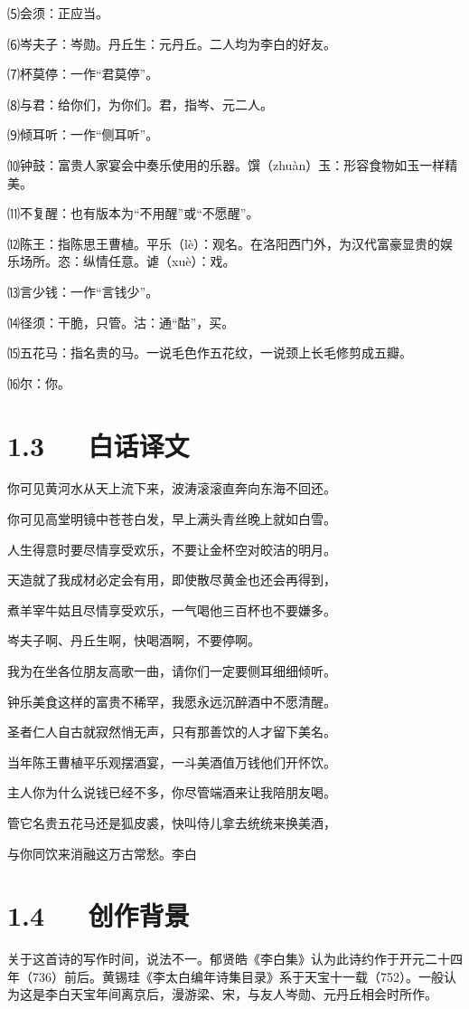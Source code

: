 \documentclass[letterpaper,10pt,english]{sphinxmanual}
\begin{document}
⑸会须：正应当。

⑹岑夫子：岑勋。丹丘生：元丹丘。二人均为李白的好友。

⑺杯莫停：一作“君莫停”。

⑻与君：给你们，为你们。君，指岑、元二人。

⑼倾耳听：一作“侧耳听”。

⑽钟鼓：富贵人家宴会中奏乐使用的乐器。馔（zhuàn）玉：形容食物如玉一样精美。

⑾不复醒：也有版本为“不用醒”或“不愿醒”。

⑿陈王：指陈思王曹植。平乐（lè）：观名。在洛阳西门外，为汉代富豪显贵的娱乐场所。恣：纵情任意。谑（xuè）：戏。

⒀言少钱：一作“言钱少”。

⒁径须：干脆，只管。沽：通“酤”，买。

⒂五花马：指名贵的马。一说毛色作五花纹，一说颈上长毛修剪成五瓣。

⒃尔：你。


\section{1.3   白话译文}
\label{\detokenize{p01_u6563_u6587/_u674e_u767d-_u5c06_u8fdb_u9152:id5}}
你可见黄河水从天上流下来，波涛滚滚直奔向东海不回还。

你可见高堂明镜中苍苍白发，早上满头青丝晚上就如白雪。

人生得意时要尽情享受欢乐，不要让金杯空对皎洁的明月。

天造就了我成材必定会有用，即使散尽黄金也还会再得到，

煮羊宰牛姑且尽情享受欢乐，一气喝他三百杯也不要嫌多。

岑夫子啊、丹丘生啊，快喝酒啊，不要停啊。

我为在坐各位朋友高歌一曲，请你们一定要侧耳细细倾听。

钟乐美食这样的富贵不稀罕，我愿永远沉醉酒中不愿清醒。

圣者仁人自古就寂然悄无声，只有那善饮的人才留下美名。

当年陈王曹植平乐观摆酒宴，一斗美酒值万钱他们开怀饮。

主人你为什么说钱已经不多，你尽管端酒来让我陪朋友喝。

管它名贵五花马还是狐皮裘，快叫侍儿拿去统统来换美酒，

与你同饮来消融这万古常愁。李白


\section{1.4   创作背景}
\label{\detokenize{p01_u6563_u6587/_u674e_u767d-_u5c06_u8fdb_u9152:id6}}
关于这首诗的写作时间，说法不一。郁贤皓《李白集》认为此诗约作于开元二十四年（736）前后。黄锡珪《李太白编年诗集目录》系于天宝十一载（752）。一般认为这是李白天宝年间离京后，漫游梁、宋，与友人岑勋、元丹丘相会时所作。
\end{document}
